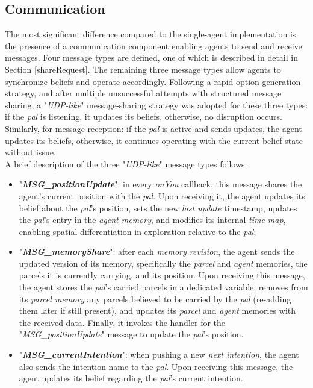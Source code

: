         
    \subsection{Communication}            
        The most significant difference compared to the single-agent implementation is the presence of a communication component enabling agents to send and receive messages. Four message types are defined, one of which is described in detail in Section \ref{shareRequest}. The remaining three message types allow agents to synchronize beliefs and operate accordingly. Following a rapid-option-generation strategy, and after multiple unsuccessful attempts with structured message sharing, a "\textit{UDP-like}" message-sharing strategy was adopted for these three types: if the \textit{pal} is listening, it updates its beliefs, otherwise, no disruption occurs. Similarly, for message reception: if the \textit{pal} is active and sends updates, the agent updates its beliefs, otherwise, it continues operating with the current belief state without issue.
        \medskip\\
        A brief description of the three "\textit{UDP-like}" message types follows:
        \begin{itemize}
            \item "\textbf{\textit{MSG\_positionUpdate}}": in every \textit{onYou} callback, this message shares the agent's current position with the \textit{pal}. Upon receiving it, the agent updates its belief about the \textit{pal}'s position, sets the new \textit{last update} timestamp, updates the \textit{pal}'s entry in the \textit{agent memory}, and modifies its internal \textit{time map}, enabling spatial differentiation in exploration relative to the \textit{pal};                    
            \item "\textbf{\textit{MSG\_memoryShare}}": after each \textit{memory revision}, the agent sends the updated version of its memory, specifically the \textit{parcel} and \textit{agent} memories, the parcels it is currently carrying, and its position. Upon receiving this message, the agent stores the \textit{pal}'s carried parcels in a dedicated variable, removes from its \textit{parcel memory} any parcels believed to be carried by the \textit{pal} (re-adding them later if still present), and updates its \textit{parcel} and \textit{agent} memories with the received data. Finally, it invokes the handler for the "\textit{MSG\_positionUpdate}" message to update the \textit{pal}'s position.
            \item "\textbf{\textit{MSG\_currentIntention}}": when pushing a new \textit{next intention}, the agent also sends the intention name to the \textit{pal}. Upon receiving this message, the agent updates its belief regarding the \textit{pal}'s current intention.
        \end{itemize}
        
